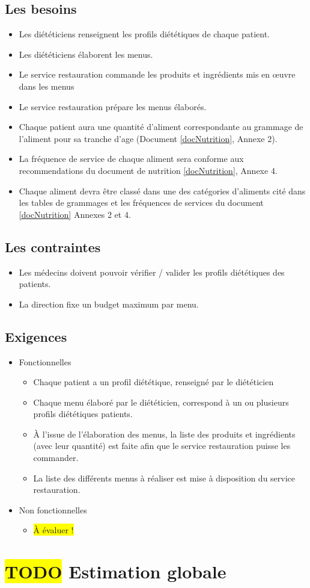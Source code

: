 \subsection{Les besoins}
\begin{itemize}
\item Les diététiciens renseignent les profils diététiques de chaque patient.
\item Les diététiciens élaborent les menus.
\item Le service restauration commande les produits et ingrédients mis en œuvre dans les menus
\item Le service restauration prépare les menus élaborés.
\item Chaque patient aura une quantité d'aliment correspondante au grammage de l'aliment pour sa tranche d'age (Document \ref{docNutrition}, Annexe 2).
\item La fréquence de service de chaque aliment sera conforme aux recommendations du document de nutrition \ref{docNutrition}, Annexe 4.
\item Chaque aliment devra être classé dans une des catégories d'aliments cité dans les tables de grammages et les fréquences de services du document \ref{docNutrition} Annexes 2 et 4.
\end{itemize}

\subsection{Les contraintes}
\begin{itemize}
\item Les médecins doivent pouvoir vérifier / valider les profils diététiques des patients.
\item La direction fixe un budget maximum par menu.
\end{itemize}

\subsection{Exigences}
\begin{itemize}
\item Fonctionnelles
  \begin{itemize}
  \item Chaque patient a un profil diététique, renseigné par le diététicien
  \item Chaque menu élaboré par le diététicien, correspond à un ou plusieurs profils diététiques patients.
  \item À l'issue de l'élaboration des menus, la liste des produits et
    ingrédients (avec leur quantité) est faite afin que le service
    restauration puisse les commander.
  \item La liste des différents menus à réaliser est mise à disposition du service restauration.
  \end{itemize}
\item Non fonctionnelles
  \begin{itemize}
  \item \colorbox{yellow}{À évaluer !}
  \end{itemize}
\end{itemize}

\section{\colorbox{yellow}{TODO} Estimation globale}
